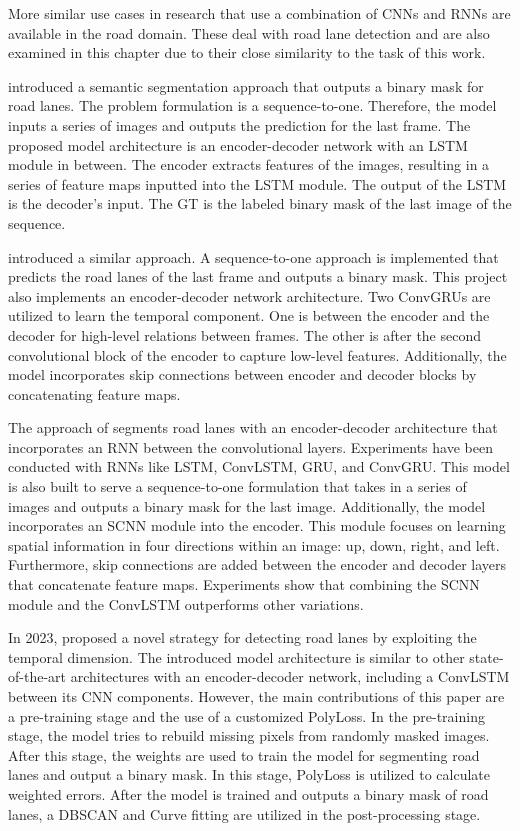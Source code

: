 More similar use cases in research that use a combination of \ac{CNN}s and \ac{RNN}s are available in the road domain.
These deal with road lane detection and are also examined in this chapter due to their close similarity to the task of this work.

\cite{robustLaneDetection2020} introduced a semantic segmentation approach that outputs a binary mask for road lanes.
The problem formulation is a sequence-to-one.
Therefore, the model inputs a series of images and outputs the prediction for the last frame.
The proposed model architecture is an encoder-decoder network with an \ac{LSTM} module in between.
The encoder extracts features of the images, resulting in a series of feature maps inputted into the \ac{LSTM} module.
The output of the \ac{LSTM} is the decoder's input.
The \ac{GT} is the labeled binary mask of the last image of the sequence.

\cite{CNNGRU2022} introduced a similar approach.
A sequence-to-one approach is implemented that predicts the road lanes of the last frame and outputs a binary mask.
This project also implements an encoder-decoder network architecture.
Two ConvGRUs are utilized to learn the temporal component.
One is between the encoder and the decoder for high-level relations between frames.
The other is after the second convolutional block of the encoder to capture low-level features.
Additionally, the model incorporates skip connections between encoder and decoder blocks by concatenating feature maps.

The approach of \cite{hybridSTLanedetction2023} segments road lanes with an encoder-decoder architecture that incorporates an \ac{RNN} between the convolutional layers.
Experiments have been conducted with \ac{RNN}s like \ac{LSTM}, ConvLSTM, \ac{GRU}, and ConvGRU.
This model is also built to serve a sequence-to-one formulation that takes in a series of images and outputs a binary mask for the last image.
Additionally, the model incorporates an SCNN module into the encoder.
This module focuses on learning spatial information in four directions within an image: up, down, right, and left. Furthermore, skip connections are added between the encoder and decoder layers that concatenate feature maps.
Experiments show that combining the SCNN module and the ConvLSTM outperforms other variations.

In 2023, \cite{robustLaneDetection2023} proposed a novel strategy for detecting road lanes by exploiting the temporal dimension.
The introduced model architecture is similar to other state-of-the-art architectures with an encoder-decoder network, including a ConvLSTM between its \ac{CNN} components.
However, the main contributions of this paper are a pre-training stage and the use of a customized PolyLoss.
In the pre-training stage, the model tries to rebuild missing pixels from randomly masked images.
After this stage, the weights are used to train the model for segmenting road lanes and output a binary mask.
In this stage, PolyLoss is utilized to calculate weighted errors.
After the model is trained and outputs a binary mask of road lanes, a DBSCAN and Curve fitting are utilized in the post-processing stage.

